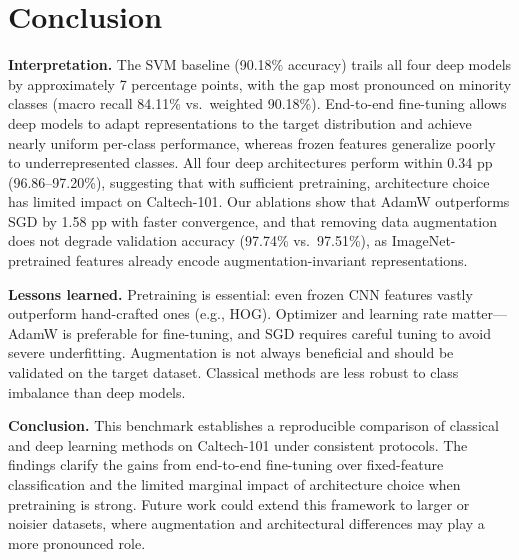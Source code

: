 \section{Conclusion}

\textbf{Interpretation.} The SVM baseline (90.18\% accuracy) trails all four deep models by approximately 7 percentage points, with the gap most pronounced on minority classes (macro recall 84.11\% vs.\ weighted 90.18\%). End-to-end fine-tuning allows deep models to adapt representations to the target distribution and achieve nearly uniform per-class performance, whereas frozen features generalize poorly to underrepresented classes. All four deep architectures perform within 0.34 pp (96.86--97.20\%), suggesting that with sufficient pretraining, architecture choice has limited impact on Caltech-101. Our ablations show that AdamW outperforms SGD by 1.58 pp with faster convergence, and that removing data augmentation does not degrade validation accuracy (97.74\% vs.\ 97.51\%), as ImageNet-pretrained features already encode augmentation-invariant representations.

\textbf{Lessons learned.} Pretraining is essential: even frozen CNN features vastly outperform hand-crafted ones (e.g., HOG). Optimizer and learning rate matter---AdamW is preferable for fine-tuning, and SGD requires careful tuning to avoid severe underfitting. Augmentation is not always beneficial and should be validated on the target dataset. Classical methods are less robust to class imbalance than deep models.

\textbf{Conclusion.} This benchmark establishes a reproducible comparison of classical and deep learning methods on Caltech-101 under consistent protocols. The findings clarify the gains from end-to-end fine-tuning over fixed-feature classification and the limited marginal impact of architecture choice when pretraining is strong. Future work could extend this framework to larger or noisier datasets, where augmentation and architectural differences may play a more pronounced role.
